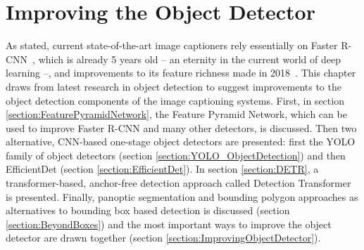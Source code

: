 \documentclass[english,twoside,openright]{HYgraduMLDS}
\begin{document}
\chapter{Improving the Object Detector}
\label{chapter:objectdetector_improvements}
As stated, current state-of-the-art image captioners rely essentially on Faster R-CNN~\cite{FasterRCNN}, which is already 5 years old -- an eternity in the current world of deep learning --, and improvements to its feature richness made in 2018~\cite{BottomUp}. This chapter draws from latest research in object detection to suggest improvements to the object detection components of the image captioning systems. First, in section \ref{section:FeaturePyramidNetwork}, the Feature Pyramid Network, which can be used to improve Faster R-CNN and many other detectors, is discussed. Then two alternative, CNN-based one-stage object detectors are presented: first the YOLO family of object detectors (section \ref{section:YOLO_ObjectDetection}) and then EfficientDet (section \ref{section:EfficientDet}). In section \ref{section:DETR}, a transformer-based, anchor-free detection approach called Detection Transformer is presented. Finally, panoptic segmentation and bounding polygon approaches as alternatives to bounding box based detection is discussed (section \ref{section:BeyondBoxes}) and the most important ways to improve the object detector are drawn together (section \ref{section:ImprovingObjectDetector}).
\end{document}
